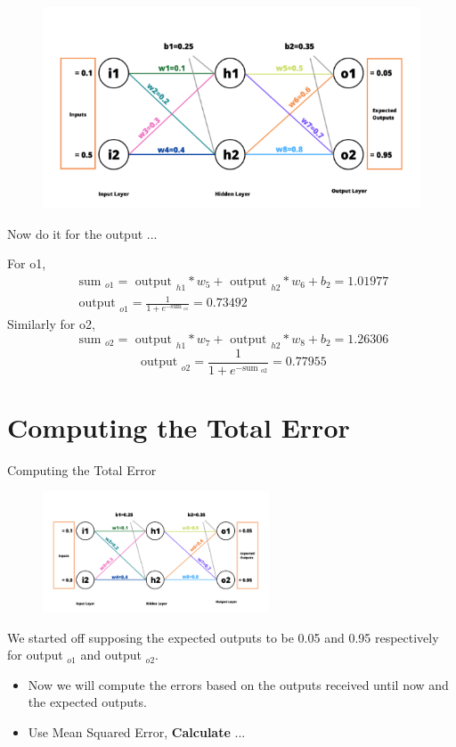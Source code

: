 \documentclass[8pt,dvipsnames]{beamer}
\begin{document}
\begin{frame}
	\begin{figure}
		\centering
		\includegraphics[width=\textwidth]{imgs/nn_2.png}
	\end{figure}
	Now do it for the output ... 
\end{frame}

\begin{frame}
	For o1, 
	$$
	\begin{array}{c}\text { sum }_{o 1}=\text { output }_{h 1} * w_{5}+\text { output }_{h 2} * w_{6}+b_{2}=1.01977 \\ \text { output }_{o 1}=\frac{1}{1+e^{- \text {sum }_{o 1}}}=0.73492\end{array}
	$$
	Similarly for o2,
	$$
	\text { sum }_{o 2}=\text { output }_{h 1} * w_{7}+\text { output }_{h 2} * w_{8}+b_{2}=1.26306
	$$
	$$
	\text { output }_{o 2}=\frac{1}{1+e^{- \text {sum }_{o 2}}}=0.77955
	$$
\end{frame}

\section{Computing the Total Error}
\begin{frame}{Computing the Total Error}
	\begin{figure}
		\centering
		\includegraphics[width=0.6\textwidth]{imgs/nn_2.png}
	\end{figure}
	We started off supposing the expected outputs to be 0.05 and 0.95 respectively for output \({ }_{o 1}\) and output \(_{o 2}\). 
	\begin{itemize}
		\item Now we will compute the errors based on the outputs received until now and the expected outputs.
		\item Use Mean Squared Error, \textbf{Calculate} ... 
	\end{itemize}
\end{frame}
\end{document}
